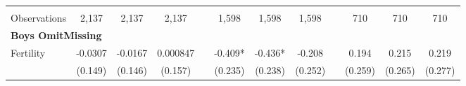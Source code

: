 \begin{landscape}
\begin{table}[htpb!]
\begin{center}
\begin{tabular}{lcccp{2mm}cccp{2mm}ccc}
\begin{footnotesize}\end{footnotesize}&\begin{footnotesize}\end{footnotesize}&\begin{footnotesize}\end{footnotesize}&\begin{footnotesize}\end{footnotesize}&\begin{footnotesize}\end{footnotesize}&\begin{footnotesize}\end{footnotesize}&\begin{footnotesize}\end{footnotesize}&\begin{footnotesize}\end{footnotesize}&\begin{footnotesize}\end{footnotesize}&\begin{footnotesize}\end{footnotesize}&\begin{footnotesize}\end{footnotesize}&\begin{footnotesize}\end{footnotesize}\\Observations&2,137&2,137&2,137&&1,598&1,598&1,598&&710&710&710\\
\multicolumn{12}{l}{\textbf{Boys OmitMissing}}\\ 
Fertility&-0.0307&-0.0167&0.000847&&-0.409*&-0.436*&-0.208&&0.194&0.215&0.219\\
&(0.149)&(0.146)&(0.157)&&(0.235)&(0.238)&(0.252)&&(0.259)&(0.265)&(0.277)\\

\end{tabular}
\end{center}
\end{table}
\end{landscape}

